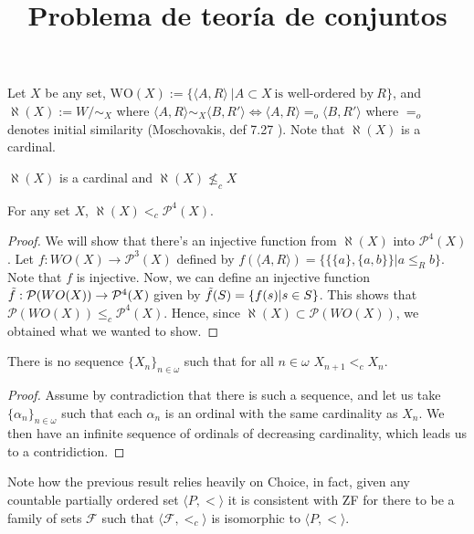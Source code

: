 \documentclass{article}
\title{Problema de teoría de conjuntos}
\begin{document}
\begin{definition}
    Let $X$ be any set, $\text{WO}(X):=\{\langle A,R\rangle\ |A\subset X \ \text{is well-ordered by}\ R\}$, 
    and $\aleph(X):= W/{\sim_X}$ 
    where $\langle A,R\rangle \sim_X \langle B, R'\rangle \Longleftrightarrow \langle A, R\rangle =_o \langle B, R'\rangle$ where $=_o$ denotes initial similarity (Moschovakis, def 7.27 \cite{Moscho}). 
    Note that $\aleph(X)$ is a cardinal.
\end{definition}
\begin{claim}
    $\aleph(X)$ is a cardinal and $\aleph(X)\nleq_c X$
\end{claim}
\begin{theorem}
For any set $X$, $\aleph(X)<_c \mathcal{P}^4(X)$.
\end{theorem}
\begin{proof}
We will show that there's an injective function from $\aleph(X)$ into $\mathcal{P}^4(X)$. Let $f:WO(X)\rightarrow \mathcal{P}^3(X)$ defined by $f(\langle A,R\rangle) = \{\{\{a\},\{a,b\}\}| a\leq_R b\}$. Note that $f$ is injective. Now, we can define an injective function $\Tilde{f}: \mathcal{P} (WO(X)) \rightarrow \mathcal{P}^4(X)$ given by $\Tilde{f}(S) = \{f(s) | s\in S\}$. This shows that $\mathcal{P} (WO(X)) \leq_c \mathcal{P}^4(X)$. Hence, since $\aleph (X) \subset \mathcal{P} (WO(X))$, we obtained what we wanted to show.
\end{proof}

\begin{theorem}[ZFC]
	There is no sequence $\{X_n\}_{n\in\omega}$ such that for all $n\in\omega$ $X_{n+1} <_c X_n$.
\end{theorem}
\begin{proof}
	Assume by contradiction that there is such a sequence, and let us take $\{\alpha_n\}_{n\in\omega}$ such that each $\alpha_n$ is an ordinal with the same cardinality as $X_n$. We then have an infinite sequence of ordinals of decreasing cardinality, which leads us to a contridiction.
\end{proof}

Note how the previous result relies heavily on Choice, in fact, given any countable partially ordered set $\langle P,< \rangle$ it is consistent with ZF for there to be a family of sets $\mathcal{F}$ such that $\langle \mathcal{F},<_c\rangle$ is isomorphic to $\langle P,< \rangle$.
\end{document}
